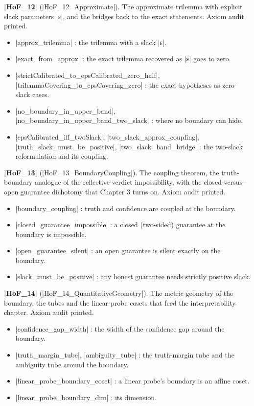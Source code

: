 \documentclass{memoir}
\begin{document}
\textbf{\LeanVerb|HoF_12|} (\LeanVerb|HoF_12_Approximate|). The approximate trilemma with explicit slack
parameters \LeanVerb|ε|, and the bridges back to the exact statements. Axiom audit printed.

\begin{itemize}
\item \LeanVerb|approx_trilemma| : the trilemma with a slack \LeanVerb|ε|.
\item \LeanVerb|exact_from_approx| : the exact trilemma recovered as \LeanVerb|ε| goes to zero.
\item \LeanVerb|strictCalibrated_to_epsCalibrated_zero_half|,
   \LeanVerb|trilemmaCovering_to_epsCovering_zero| : the exact hypotheses as zero-slack
   cases.
\item \LeanVerb|no_boundary_in_upper_band|, \LeanVerb|no_boundary_in_upper_band_two_slack| : where no
   boundary can hide.
\item \LeanVerb|epsCalibrated_iff_twoSlack|, \LeanVerb|two_slack_approx_coupling|,
   \LeanVerb|truth_slack_must_be_positive|, \LeanVerb|two_slack_band_bridge| : the two-slack
   reformulation and its coupling.

\end{itemize}


\textbf{\LeanVerb|HoF_13|} (\LeanVerb|HoF_13_BoundaryCoupling|). The coupling theorem, the truth-boundary
analogue of the reflective-verdict impossibility, with the closed-versus-open
guarantee dichotomy that Chapter 3 turns on. Axiom audit printed.

\begin{itemize}
\item \LeanVerb|boundary_coupling| : truth and confidence are coupled at the boundary.
\item \LeanVerb|closed_guarantee_impossible| : a closed (two-sided) guarantee at the boundary is
   impossible.
\item \LeanVerb|open_guarantee_silent| : an open guarantee is silent exactly on the boundary.
\item \LeanVerb|slack_must_be_positive| : any honest guarantee needs strictly positive slack.

\end{itemize}


\textbf{\LeanVerb|HoF_14|} (\LeanVerb|HoF_14_QuantitativeGeometry|). The metric geometry of the boundary, the
tubes and the linear-probe cosets that feed the interpretability chapter. Axiom
audit printed.

\begin{itemize}
\item \LeanVerb|confidence_gap_width| : the width of the confidence gap around the boundary.
\item \LeanVerb|truth_margin_tube|, \LeanVerb|ambiguity_tube| : the truth-margin tube and the ambiguity
   tube around the boundary.
\item \LeanVerb|linear_probe_boundary_coset| : a linear probe's boundary is an affine coset.
\item \LeanVerb|linear_probe_boundary_dim| : its dimension.

\end{itemize}
\end{document}
